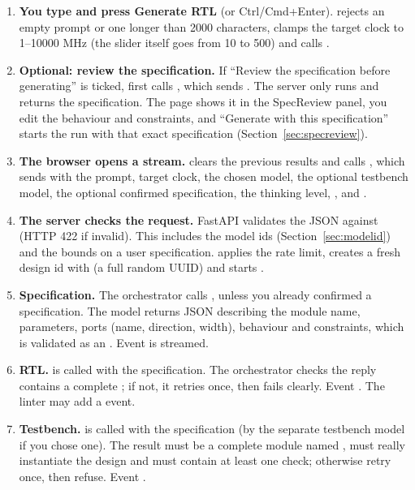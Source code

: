 \begin{enumerate}[leftmargin=*,label=\textbf{Step \arabic*.}]
  \item \textbf{You type and press Generate RTL} (or Ctrl/Cmd+Enter).  rejects an empty prompt or one longer than 2000 characters, clamps the target clock to 1--10000 MHz (the slider itself goes from 10 to 500) and calls .
  \item \textbf{Optional: review the specification.} If ``Review the specification before generating'' is ticked,  first calls , which sends . The server only runs  and returns the specification. The page shows it in the SpecReview panel, you edit the behaviour and constraints, and ``Generate with this specification'' starts the run with that exact specification (Section~\ref{sec:specreview}).
  \item \textbf{The browser opens a stream.}  clears the previous results and calls , which sends  with the prompt, target clock, the chosen model, the optional testbench model, the optional confirmed specification, the thinking level, ,  and .
  \item \textbf{The server checks the request.} FastAPI validates the JSON against  (HTTP 422 if invalid). This includes the model ids (Section~\ref{sec:modelid}) and the bounds on a user specification.  applies the rate limit, creates a fresh design id with  (a full random UUID) and starts .
  \item \textbf{Specification.} The orchestrator calls , unless you already confirmed a specification. The model returns JSON describing the module name, parameters, ports (name, direction, width), behaviour and constraints, which is validated as an . Event  is streamed.
  \item \textbf{RTL.}  is called with the specification. The orchestrator checks the reply contains a complete ; if not, it retries once, then fails clearly. Event . The linter may add a  event.
  \item \textbf{Testbench.}  is called with the specification (by the separate testbench model if you chose one). The result must be a complete module named , must really instantiate the design and must contain at least one check; otherwise retry once, then refuse. Event .

\end{enumerate}
